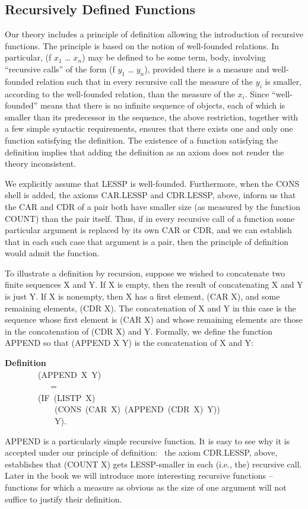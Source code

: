 \documentclass[10pt]{book}
\newenvironment{pubasis}{\begin{flushleft}}{\end{flushleft}}
\newcommand{\axiomordefinition}[1]{\vspace{6pt}\Large\textsf{\textbf{#1}}\normalsize}
\begin{document}
\subsection{Recursively Defined Functions}
Our theory includes a principle of definition allowing the introduction
of recursive functions.  The principle is based on the notion of well-founded
relations.  In particular, (f $x_{1}$ \ldots{} $x_{n}$) may be defined
to be some term, body, involving ``recursive calls'' of the form
(f $y_{1}$ \ldots{} $y_{n}$), provided there is a measure and well-founded relation
such that in every recursive call the measure of the $y_{i}$ is
smaller, according to the well-founded relation, than the measure of
the $x_{i}$.
Since ``well-founded'' means that there is no infinite sequence
of objects, each of which is smaller than its predecessor in the sequence,
the above restriction, together with a few simple syntactic requirements,
ensures that there exists one and only one function satisfying
the definition.  The existence of a function satisfying the
definition implies that adding the definition as an axiom does not
render the theory inconsistent.

We explicitly assume that LESSP
is well-founded.  Furthermore, when the
CONS shell is added, the axioms
CAR.LESSP and CDR.LESSP, above, inform us that the CAR and CDR of a pair
both have smaller size (as measured by the function COUNT) than the pair itself.
Thus, if in every recursive call of a function some particular argument is
replaced by
its own CAR or CDR, and we can establish that in each such case that
argument is a pair, then the principle of definition would
admit the function.

To illustrate a definition by recursion, suppose we wished to concatenate two finite
sequences X and Y.  If X is empty, then the result of
concatenating X and Y is just Y.  If X is nonempty, then X has
a first element, (CAR X), and some remaining elements, (CDR X).
The concatenation of X and Y in this case is the
sequence whose first element is (CAR X) and whose remaining elements
are those in the concatenation of (CDR X) and Y.  Formally, we define the function
APPEND so that (APPEND X Y) is the concatenation of X and Y:
\begin{pubasis}
\axiomordefinition{Definition}\\
~~~~~~~~(APPEND~X~Y)\\
~~~~~~~~~~~=\\
~~~~~~~~(IF~(LISTP~X)\\
~~~~~~~~~~~~(CONS~(CAR~X)~(APPEND~(CDR~X)~Y))\\
~~~~~~~~~~~~Y).\\
\end{pubasis}
APPEND is a particularly simple recursive function.  It is
easy to see why it is accepted under our principle of definition:~
the axiom CDR.LESSP, above, establishes that
(COUNT X) gets LESSP-smaller in each (i.e., the) recursive call.
Later in the book we will introduce more interesting recursive
functions -- functions for which a measure as obvious as the size of
one argument will not suffice to justify their definition.
\end{document}
